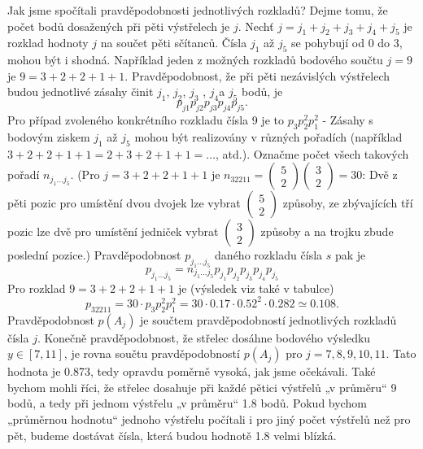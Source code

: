 \begin{example}
  Jak jsme spočítali pravděpodobnosti jednotlivých rozkladů? Dejme tomu, že počet bodů dosažených 
  při pěti výstřelech je \(j\). Nechť \(j = j_1 + j_2 + j_3 + j_4 + j_5\) je rozklad hodnoty \(j\) 
  na součet pěti sčítanců. Čísla \(j_1\) až \(j_5\) se pohybují od \num{0} do \num{3}, mohou být i 
  shodná. Například jeden z možných rozkladů bodového součtu \(j = 9\) je \(9 = 3 + 2 + 2 + 1 + 
  1\). Pravděpodobnost, že při pěti nezávislých výstřelech budou jednotlivé zásahy činit \(j_1\), 
  \(j_2\), \(j_3\) , \(j_4\)a \(j_5\) bodů, je
  \begin{equation*}
    p_{j1}p_{j2}p_{j3}p_{j4}p_{j5}.
  \end{equation*}
  Pro případ zvoleného konkrétního rozkladu čísla \num{9} je to \(p_3p_2^2p_1^2\) - Zásahy s 
  bodovým ziskem \(j_1\) až \(j_5\) mohou být realizovány v různých pořadích (například \(\num{3} + 
  \num{2} + \num{2} + \num{1} + \num{1} = \num{2} + \num{3} + \num{2} + \num{1} + \num{1} 
  =\ldots\), atd.). Označme počet všech takových pořadí \(n_{j_1\ldots j_5}\). (Pro \(j = \num{3} + 
  \num{2} + \num{2} + \num{1} + \num{1}\) je \(n_{32211} = \begin{pmatrix} 5 \\ 2 
  \end{pmatrix}\begin{pmatrix} 3 \\ 2 \end{pmatrix} = 30\): Dvě z pěti pozic pro umístění dvou
  dvojek lze vybrat \(\begin{pmatrix} 5 \\ 2 \end{pmatrix}\)  způsoby, ze zbývajících tří pozic lze 
  dvě pro umístění jedniček vybrat \(\begin{pmatrix} 3 \\ 2 \end{pmatrix}\) způsoby a na
  trojku zbude poslední pozice.) Pravděpodobnost \(p_{j_1\ldots j_5}\) daného rozkladu čísla \(s\) 
  pak je
  \begin{equation*}
    p_{j_1\ldots j_5} = n_{j_1\ldots j_5}p_{j_1}p_{j_2}p_{j_3}p_{j_4}p_{j_5}
  \end{equation*}
  Pro rozklad \(\num{9} = \num{3} + \num{2} + \num{2} + \num{1} + \num{1}\) je (výsledek viz také v 
  tabulce)
  \begin{equation*}
    p_{32211} =30\cdot p_3p_2^2p_1^2 = \num{30}\cdot\num{0.17}\cdot\num{0.52}^2\cdot\num{0,282} 
              \simeq \num{0.108}.
  \end{equation*}
  Pravděpodobnost \(p(A_j)\) je součtem pravděpodobností jednotlivých rozkladů čísla \(j\). Konečně 
  pravděpodobnost, že střelec dosáhne bodového výsledku \(y \in [7, 11]\), je rovna součtu 
  pravděpodobností \(p(A_j)\) pro \(j = 7, 8, 9, 10, 11\). Tato hodnota je \num{0.873}, tedy 
  opravdu poměrně vysoká, jak jsme očekávali. Také bychom mohli říci, že střelec dosahuje při každé 
  pětici výstřelů „v průměru“ \num{9} bodů, a tedy při jednom výstřelu „v průměru“ \num{1.8} bodů. 
  Pokud bychom „průměrnou hodnotu“ jednoho výstřelu počítali i pro jiný počet výstřelů než pro pět, 
  budeme dostávat čísla, která budou hodnotě \num{1.8} velmi blízká.
\normalsize
\end{example}